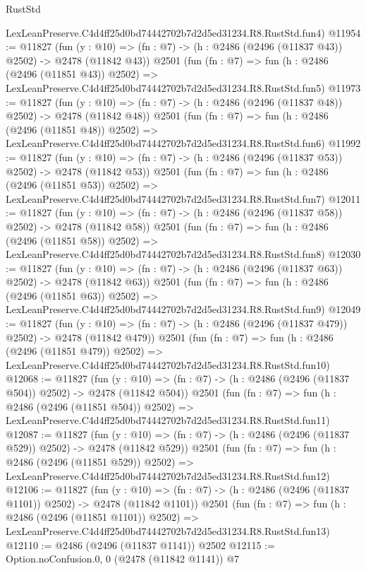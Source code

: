 \begin{lexlean}{RustStd}
\begin{coremodule}
    LexLeanPreserve.C4d4ff25d0bd74442702b7d2d5ed31234.R8.RustStd.fun4)
@11954 := @11827
    (fun (y : @10) => (fn : @7) -> (h : @2486 (@2496 (@11837 @43)) @2502) -> @2478 (@11842 @43))
    @2501
    (fun (fn : @7) =>
    fun (h : @2486 (@2496 (@11851 @43)) @2502) =>
    LexLeanPreserve.C4d4ff25d0bd74442702b7d2d5ed31234.R8.RustStd.fun5)
@11973 := @11827
    (fun (y : @10) => (fn : @7) -> (h : @2486 (@2496 (@11837 @48)) @2502) -> @2478 (@11842 @48))
    @2501
    (fun (fn : @7) =>
    fun (h : @2486 (@2496 (@11851 @48)) @2502) =>
    LexLeanPreserve.C4d4ff25d0bd74442702b7d2d5ed31234.R8.RustStd.fun6)
@11992 := @11827
    (fun (y : @10) => (fn : @7) -> (h : @2486 (@2496 (@11837 @53)) @2502) -> @2478 (@11842 @53))
    @2501
    (fun (fn : @7) =>
    fun (h : @2486 (@2496 (@11851 @53)) @2502) =>
    LexLeanPreserve.C4d4ff25d0bd74442702b7d2d5ed31234.R8.RustStd.fun7)
@12011 := @11827
    (fun (y : @10) => (fn : @7) -> (h : @2486 (@2496 (@11837 @58)) @2502) -> @2478 (@11842 @58))
    @2501
    (fun (fn : @7) =>
    fun (h : @2486 (@2496 (@11851 @58)) @2502) =>
    LexLeanPreserve.C4d4ff25d0bd74442702b7d2d5ed31234.R8.RustStd.fun8)
@12030 := @11827
    (fun (y : @10) => (fn : @7) -> (h : @2486 (@2496 (@11837 @63)) @2502) -> @2478 (@11842 @63))
    @2501
    (fun (fn : @7) =>
    fun (h : @2486 (@2496 (@11851 @63)) @2502) =>
    LexLeanPreserve.C4d4ff25d0bd74442702b7d2d5ed31234.R8.RustStd.fun9)
@12049 := @11827
    (fun (y : @10) => (fn : @7) -> (h : @2486 (@2496 (@11837 @479)) @2502) -> @2478 (@11842 @479))
    @2501
    (fun (fn : @7) =>
    fun (h : @2486 (@2496 (@11851 @479)) @2502) =>
    LexLeanPreserve.C4d4ff25d0bd74442702b7d2d5ed31234.R8.RustStd.fun10)
@12068 := @11827
    (fun (y : @10) => (fn : @7) -> (h : @2486 (@2496 (@11837 @504)) @2502) -> @2478 (@11842 @504))
    @2501
    (fun (fn : @7) =>
    fun (h : @2486 (@2496 (@11851 @504)) @2502) =>
    LexLeanPreserve.C4d4ff25d0bd74442702b7d2d5ed31234.R8.RustStd.fun11)
@12087 := @11827
    (fun (y : @10) => (fn : @7) -> (h : @2486 (@2496 (@11837 @529)) @2502) -> @2478 (@11842 @529))
    @2501
    (fun (fn : @7) =>
    fun (h : @2486 (@2496 (@11851 @529)) @2502) =>
    LexLeanPreserve.C4d4ff25d0bd74442702b7d2d5ed31234.R8.RustStd.fun12)
@12106 := @11827
    (fun (y : @10) => (fn : @7) -> (h : @2486 (@2496 (@11837 @1101)) @2502) -> @2478 (@11842 @1101))
    @2501
    (fun (fn : @7) =>
    fun (h : @2486 (@2496 (@11851 @1101)) @2502) =>
    LexLeanPreserve.C4d4ff25d0bd74442702b7d2d5ed31234.R8.RustStd.fun13)
@12110 := @2486 (@2496 (@11837 @1141)) @2502
@12115 := Option.noConfusion.{0, 0} (@2478 (@11842 @1141)) @7

\end{coremodule}
\end{lexlean}
